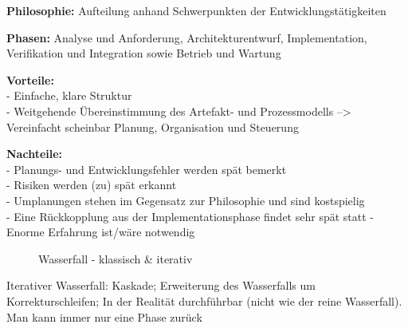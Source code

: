 \textbf{Philosophie:}  Aufteilung anhand Schwerpunkten der Entwicklungstätigkeiten 

\textbf{Phasen:} Analyse und Anforderung, Architekturentwurf, Implementation, Verifikation und Integration sowie Betrieb und Wartung

\textbf{Vorteile:} \\
- Einfache, klare Struktur \\
- Weitgehende Übereinstimmung des Artefakt- und Prozessmodells --> Vereinfacht scheinbar Planung, Organisation und Steuerung 

\textbf{Nachteile:} \\
- Planungs- und Entwicklungsfehler werden spät bemerkt  \\
- Risiken werden (zu) spät erkannt \\
- Umplanungen stehen im Gegensatz zur Philosophie und sind kostspielig \\
- Eine Rückkopplung aus der Implementationsphase findet sehr spät statt
- Enorme Erfahrung ist/wäre notwendig
\begin{figure}[ht]
	\centering
{}
\caption[]{Wasserfall - klassisch \& iterativ}
\end{figure}	
Iterativer Wasserfall: Kaskade; Erweiterung des Wasserfalls um Korrekturschleifen; In der Realität durchführbar (nicht wie der reine Wasserfall). Man kann immer nur eine Phase zurück

